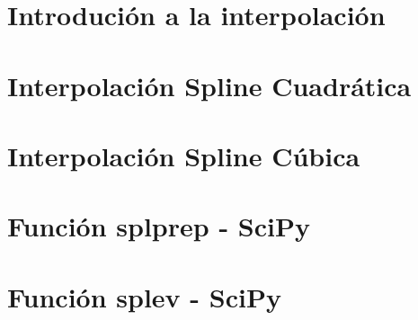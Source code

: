 \documentclass[12pt]{article}
\author{Vale Fernando Alexis}
\begin{document}
\section{Introdución a la interpolación}
  
\section{Interpolación Spline Cuadrática}
  
\section{Interpolación Spline Cúbica}
  
\section{Función splprep - SciPy}
  
\section{Función splev - SciPy}
  
\end{document}
